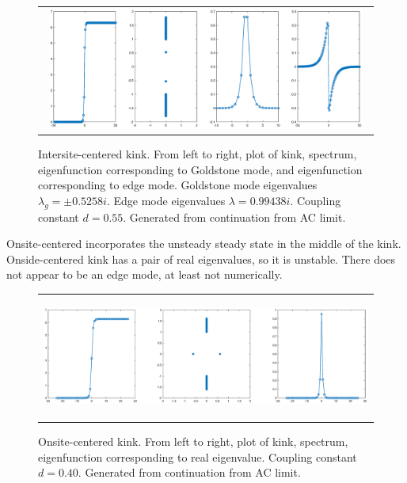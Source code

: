 \documentclass[12pt]{article}
\begin{document}
\begin{figure}[H]
\begin{center}
\begin{tabular}{c}
\includegraphics[height=4cm,width=15cm]{intersite.eps} \\
\end{tabular}
\end{center}
\caption{Intersite-centered kink. From left to right, plot of kink, spectrum, eigenfunction corresponding to Goldstone mode, and eigenfunction corresponding to edge mode. Goldstone mode eigenvalues $\lambda_g = \pm 0.5258i$. Edge mode eigenvalues $\lambda = 0.99438i$. Coupling constant $d = 0.55$. Generated from continuation from AC limit.}
\end{figure}

Onsite-centered incorporates the unsteady steady state in the middle of the kink. Onside-centered kink has a pair of real eigenvalues, so it is unstable. There does not appear to be an edge mode, at least not numerically. 
\begin{figure}[H]
\begin{center}
\begin{tabular}{c}
\includegraphics[height=4cm,width=15cm]{onsite.eps} \\
\end{tabular}
\end{center}
\caption{Onsite-centered kink. From left to right, plot of kink, spectrum, eigenfunction corresponding to real eigenvalue. Coupling constant $d = 0.40$. Generated from continuation from AC limit.}
\end{figure}
\end{document}

